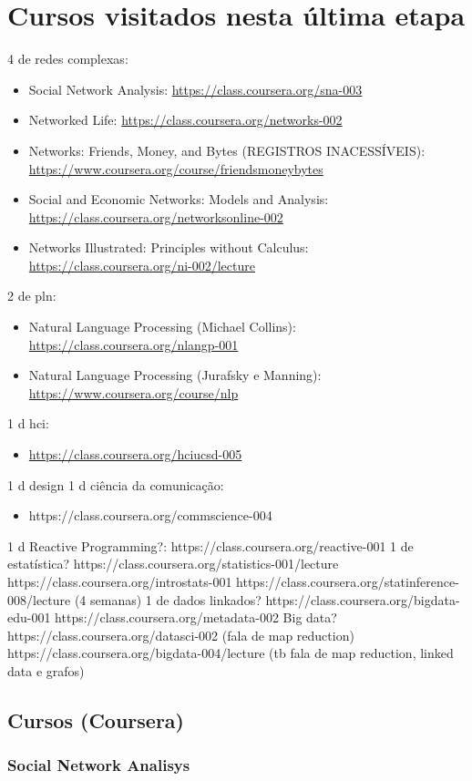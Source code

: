 \documentclass[12pt]{report}
\begin{document}
\part{Cursos visitados nesta última etapa}
4 de redes complexas:
\begin{itemize}
    \item Social Network Analysis: \url{https://class.coursera.org/sna-003}
    \item Networked Life: \url{https://class.coursera.org/networks-002}
    \item Networks: Friends, Money, and Bytes (REGISTROS INACESSÍVEIS): \url{https://www.coursera.org/course/friendsmoneybytes}
    \item Social and Economic Networks: Models and Analysis: \url{https://class.coursera.org/networksonline-002}
    \item Networks Illustrated: Principles without Calculus: \url{https://class.coursera.org/ni-002/lecture}
\end{itemize}
2 de pln:
\begin{itemize}
    \item Natural Language Processing (Michael Collins): \url{https://class.coursera.org/nlangp-001}
    \item Natural Language Processing (Jurafsky e Manning): \url{https://www.coursera.org/course/nlp}
\end{itemize}
1 d hci:
\begin{itemize}
    \item \url{https://class.coursera.org/hciucsd-005}
\end{itemize}
1 d design
1 d ciência da comunicação:
\begin{itemize}
    \item https://class.coursera.org/commscience-004
\end{itemize}
1 d Reactive Programming?:
https://class.coursera.org/reactive-001
1 de estatística?
https://class.coursera.org/statistics-001/lecture
https://class.coursera.org/introstats-001
https://class.coursera.org/statinference-008/lecture (4 semanas)
1 de dados linkados?
https://class.coursera.org/bigdata-edu-001
https://class.coursera.org/metadata-002
Big data?
https://class.coursera.org/datasci-002 (fala de map reduction)
https://class.coursera.org/bigdata-004/lecture (tb fala de map reduction, linked data e grafos)
\chapter{Cursos (Coursera)}
\section{Social Network Analisys}
\end{document}
